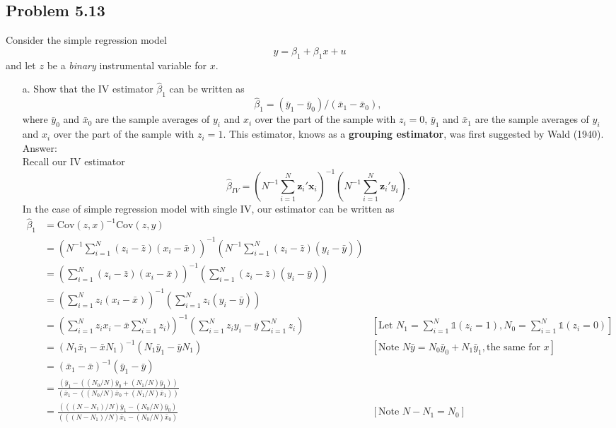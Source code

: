 \documentclass[10pt]{article}
\newcommand{\cov}{\text{Cov}}
\begin{document}
\subsection*{Problem 5.13}
Consider the simple regression model
\[y=\beta_1+\beta_1x+u\]
and let $z$ be a \textit{binary} instrumental variable for $x.$ 
\begin{enumerate}
\item[a.] Show that the IV estimator $\hat{\beta}_1$ can be written as
\[\hat{\beta}_1=(\bar{y}_1-\bar{y}_0)/(\bar{x}_1-\bar{x}_0),\]
where $\bar{y}_0$ and $\bar{x}_0$ are the sample averages of $y_i$ and $x_i$ over the part of the sample with $z_i=0$, $\bar{y}_1$ and $\bar{x}_1$ are the sample averages of $y_i$ and $x_i$ over the part of the sample with $z_i=1.$ This estimator, knows as a \textbf{grouping estimator}, was first suggested by Wald (1940).
\\ Answer:\\
Recall our IV estimator
\[\hat{\beta}_{IV}=\left(N^{-1}\sum_{i=1}^N\textbf{z}_i'\textbf{x}_i\right)^{-1}\left(N^{-1}\sum_{i=1}^N\textbf{z}_i'y_i\right).\]
In the case of simple regression model with single IV, our estimator can be written as
\begin{align*}
    \hat{\beta}_{1}&=\cov(z,x)^{-1}\cov(z,y) &\\
    &=\left(N^{-1}\sum_{i=1}^N(z_i-\bar{z})(x_i-\bar{x})\right)^{-1}\left(N^{-1}\sum_{i=1}^N(z_i-\bar{z})(y_i-\bar{y})\right) &\\
    &=\left(\sum_{i=1}^N(z_i-\bar{z})(x_i-\bar{x})\right)^{-1}\left(\sum_{i=1}^N(z_i-\bar{z})(y_i-\bar{y})\right) &\\
    &=\left(\sum_{i=1}^Nz_i(x_i-\bar{x})\right)^{-1}\left(\sum_{i=1}^N z_i(y_i-\bar{y})\right) &\\
    &=\left(\sum_{i=1}^Nz_ix_i-\bar{x}\sum_{i=1}^Nz_i)\right)^{-1}\left(\sum_{i=1}^N z_iy_i-\bar{y}\sum_{i=1}^Nz_i\right) &[\text{Let } N_1=\sum_{i=1}^N \mathds{1}(z_i=1), N_0=\sum_{i=1}^N \mathds{1}(z_i=0) ]\\
    &=\left(N_1\bar{x}_1-\bar{x}N_1\right)^{-1}\left(N_1\bar{y}_1-\bar{y}N_1\right) &[\text{Note }N\bar{y}=N_0\bar{y}_0+N_1\bar{y}_1, \text{the same for } x]\\
    &=\left(\bar{x}_1-\bar{x}\right)^{-1}\left(\bar{y}_1-\bar{y}\right) &\\
    &=\frac{\left(\bar{y}_1-((N_0/N)\bar{y}_0+(N_1/N)\bar{y}_1)\right)}{\left(\bar{x}_1-((N_0/N)\bar{x}_0+(N_1/N)\bar{x}_1)\right)} &\\
    &=\frac{\left(((N-N_1)/N)\bar{y}_1-(N_0/N)\bar{y}_0\right)}{\left(((N-N_1)/N)\bar{x}_1-(N_0/N)\bar{x}_0\right)} &[\text{Note }N-N_1=N_0]\\

\end{align*}
\end{enumerate}
\end{document}
